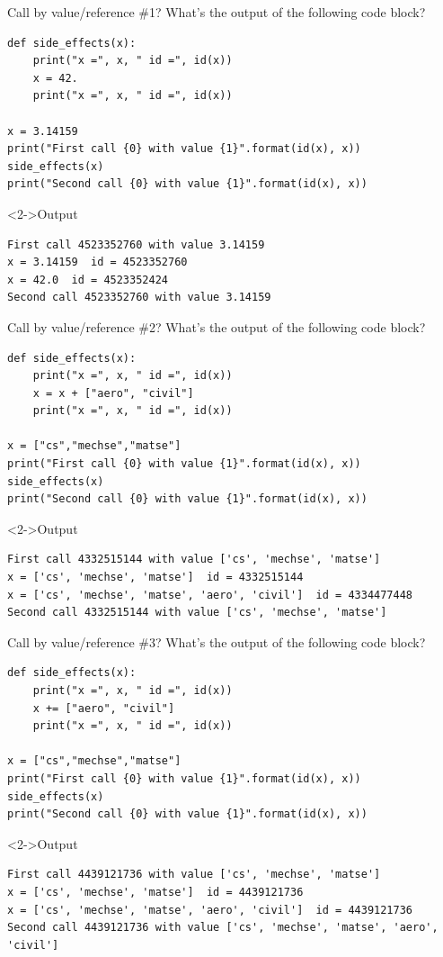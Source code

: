 \documentclass[presentation]{beamer}
\begin{document}
\begin{frame}[label={sec:orgca5e4d9},fragile]{Call by value/reference \#1?}
 What's the output of the following code block?
\footnotesize
\begin{verbatim}
def side_effects(x):
    print("x =", x, " id =", id(x))
    x = 42.
    print("x =", x, " id =", id(x))

x = 3.14159
print("First call {0} with value {1}".format(id(x), x))
side_effects(x)
print("Second call {0} with value {1}".format(id(x), x))
\end{verbatim}
\begin{block}<2->{Output}
\footnotesize
\begin{verbatim}
First call 4523352760 with value 3.14159
x = 3.14159  id = 4523352760
x = 42.0  id = 4523352424
Second call 4523352760 with value 3.14159
\end{verbatim}
\end{block}
\end{frame}
\begin{frame}[label={sec:org1219aa3},fragile]{Call by value/reference \#2?}
 What's the output of the following code block?
\footnotesize
\begin{verbatim}
def side_effects(x):
    print("x =", x, " id =", id(x))
    x = x + ["aero", "civil"]
    print("x =", x, " id =", id(x))

x = ["cs","mechse","matse"]
print("First call {0} with value {1}".format(id(x), x))
side_effects(x)
print("Second call {0} with value {1}".format(id(x), x))
\end{verbatim}
\begin{block}<2->{Output}
\scriptsize
\begin{verbatim}
First call 4332515144 with value ['cs', 'mechse', 'matse']
x = ['cs', 'mechse', 'matse']  id = 4332515144
x = ['cs', 'mechse', 'matse', 'aero', 'civil']  id = 4334477448
Second call 4332515144 with value ['cs', 'mechse', 'matse']
\end{verbatim}
\end{block}
\end{frame}
\begin{frame}[label={sec:orgb40e525},fragile]{Call by value/reference \#3?}
 What's the output of the following code block?
\footnotesize
\begin{verbatim}
def side_effects(x):
    print("x =", x, " id =", id(x))
    x += ["aero", "civil"]
    print("x =", x, " id =", id(x))

x = ["cs","mechse","matse"]
print("First call {0} with value {1}".format(id(x), x))
side_effects(x)
print("Second call {0} with value {1}".format(id(x), x))
\end{verbatim}
\begin{block}<2->{Output}
\scriptsize
\begin{verbatim}
First call 4439121736 with value ['cs', 'mechse', 'matse']
x = ['cs', 'mechse', 'matse']  id = 4439121736
x = ['cs', 'mechse', 'matse', 'aero', 'civil']  id = 4439121736
Second call 4439121736 with value ['cs', 'mechse', 'matse', 'aero', 'civil']
\end{verbatim}
\end{block}
\end{frame}
\end{document}
